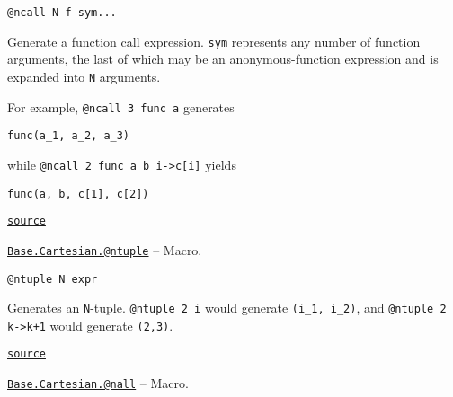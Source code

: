 \begin{adjustwidth}{2em}{0pt}


\begin{verbatim}
@ncall N f sym...
\end{verbatim}

Generate a function call expression. \texttt{sym} represents any number of function arguments, the last of which may be an anonymous-function expression and is expanded into \texttt{N} arguments.

For example, \texttt{@ncall 3 func a} generates


\begin{lstlisting}
func(a_1, a_2, a_3)
\end{lstlisting}

while \texttt{@ncall 2 func a b i->c[i]} yields


\begin{lstlisting}
func(a, b, c[1], c[2])
\end{lstlisting}



\href{https://github.com/JuliaLang/julia/blob/2d472c633d66e7697dda5aff75d2367b823048b8/base/cartesian.jl#L89-L103}{\texttt{source}}


\end{adjustwidth}
\hypertarget{4425932542618492714}{}
\hyperlink{4425932542618492714}{\texttt{Base.Cartesian.@ntuple}}  -- {Macro.}

\begin{adjustwidth}{2em}{0pt}


\begin{verbatim}
@ntuple N expr
\end{verbatim}

Generates an \texttt{N}-tuple. \texttt{@ntuple 2 i} would generate \texttt{(i\_1, i\_2)}, and \texttt{@ntuple 2 k->k+1} would generate \texttt{(2,3)}.



\href{https://github.com/JuliaLang/julia/blob/2d472c633d66e7697dda5aff75d2367b823048b8/base/cartesian.jl#L193-L198}{\texttt{source}}


\end{adjustwidth}
\hypertarget{5463798602076286002}{}
\hyperlink{5463798602076286002}{\texttt{Base.Cartesian.@nall}}  -- {Macro.}

